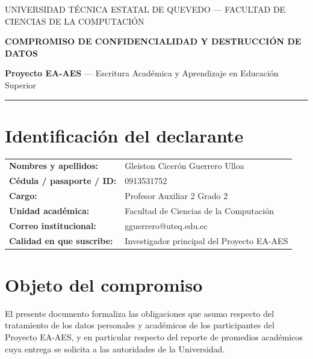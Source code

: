\documentclass[10.5pt,a4paper]{article}
\begin{document}
\begin{center}
	{\sffamily\small\color{grismedio} UNIVERSIDAD T\'ECNICA ESTATAL DE QUEVEDO --- FACULTAD DE CIENCIAS DE LA COMPUTACI\'ON\par}
	\vspace{6pt}
	{\sffamily\large\bfseries\color{azulinstitucional} COMPROMISO DE CONFIDENCIALIDAD Y DESTRUCCI\'ON DE DATOS\par}
	\vspace{4pt}
	{\sffamily\small\textbf{Proyecto EA-AES} --- Escritura Acad\'emica y Aprendizaje en Educaci\'on Superior\par}
\end{center}

\vspace{4pt}
\hrule
\vspace{8pt}

\section{Identificaci\'on del declarante}

\begin{tabular}{@{}L{4.4cm}@{}L{11.8cm}@{}}
	\textbf{\small Nombres y apellidos:} & Gleiston Cicerón Guerrero Ulloa \\
	\textbf{\small C\'edula / pasaporte / ID:} & 0913531752 \\
	\textbf{\small Cargo:} & Profesor Auxiliar 2 Grado 2 \\
	\textbf{\small Unidad acad\'emica:} & Facultad de Ciencias de la Computación \\
	\textbf{\small Correo institucional:} & gguerrero@uteq.edu.ec \\
	\textbf{\small Calidad en que suscribe:} & Investigador principal del Proyecto EA-AES \\
\end{tabular}

\section{Objeto del compromiso}

El presente documento formaliza las obligaciones que asumo respecto del tratamiento de los datos personales y acad\'emicos de los participantes del Proyecto EA-AES, y en particular respecto del reporte de promedios acad\'emicos cuya entrega se solicita a las autoridades de la Universidad.
\end{document}
